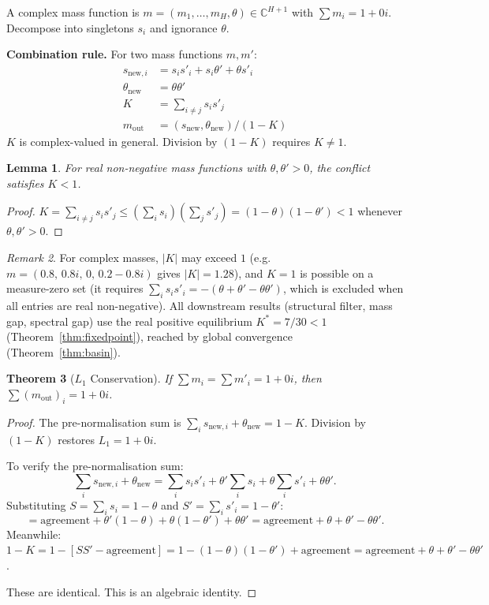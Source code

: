 \documentclass[11pt,a4paper]{article}
\newtheorem{theorem}{Theorem}[section]
\newtheorem{lemma}[theorem]{Lemma}
\theoremstyle{definition}
\theoremstyle{remark}
\newtheorem{remark}[theorem]{Remark}
\newcommand{\C}{\mathbb{C}}
\begin{document}
A complex mass function is $m=(m_1,\ldots,m_H,\theta)\in\C^{H+1}$ with $\sum m_i=1+0i$. Decompose into singletons $s_i$ and ignorance $\theta$.

\textbf{Combination rule.} For two mass functions $m,m'$:
\begin{align}
s_{\mathrm{new},i}&=s_is'_i+s_i\theta'+\theta s'_i \label{eq:snew}\\
\theta_{\mathrm{new}}&=\theta\theta' \label{eq:thnew}\\
K&=\sum_{i\neq j}s_is'_j \label{eq:K}\\
m_{\mathrm{out}}&=(s_{\mathrm{new}},\theta_{\mathrm{new}})/(1-K) \label{eq:mout}
\end{align}
$K$ is complex-valued in general. Division by $(1-K)$ requires $K\neq 1$.

\begin{lemma}\label{lem:Kbound}
For real non-negative mass functions with $\theta,\theta'>0$, the conflict satisfies $K<1$.
\end{lemma}

\begin{proof}
$K=\sum_{i\neq j}s_is'_j\leq(\sum_i s_i)(\sum_j s'_j)=(1-\theta)(1-\theta')<1$ whenever $\theta,\theta'>0$.
\end{proof}

\begin{remark}\label{rem:Kcomplex}
For complex masses, $|K|$ may exceed $1$ (e.g.\ $m=(0.8,\,0.8i,\,0,\,0.2\!-\!0.8i)$ gives $|K|=1.28$), and $K=1$ is possible on a measure-zero set (it requires $\sum_i s_is'_i=-({\theta+\theta'-\theta\theta'})$, which is excluded when all entries are real non-negative). All downstream results (structural filter, mass gap, spectral gap) use the real positive equilibrium $K^*=7/30<1$ (Theorem~\ref{thm:fixedpoint}), reached by global convergence (Theorem~\ref{thm:basin}).
\end{remark}

\begin{theorem}[$L_1$ Conservation]\label{thm:L1}
If $\sum m_i=\sum m'_i=1+0i$, then $\sum(m_{\mathrm{out}})_i=1+0i$.
\end{theorem}

\begin{proof}
The pre-normalisation sum is $\sum_i s_{\mathrm{new},i}+\theta_{\mathrm{new}}=1-K$. Division by $(1-K)$ restores $L_1=1+0i$.

To verify the pre-normalisation sum:
\[
\sum_i s_{\mathrm{new},i}+\theta_{\mathrm{new}} = \sum_i s_is'_i + \theta'\sum_i s_i + \theta\sum_i s'_i + \theta\theta'.
\]
Substituting $S=\sum_i s_i=1-\theta$ and $S'=\sum_i s'_i=1-\theta'$:
\[
=\text{agreement}+\theta'(1-\theta)+\theta(1-\theta')+\theta\theta' = \text{agreement}+\theta+\theta'-\theta\theta'.
\]
Meanwhile: $1-K=1-[SS'-\text{agreement}]=1-(1-\theta)(1-\theta')+\text{agreement}=\text{agreement}+\theta+\theta'-\theta\theta'$.

These are identical. This is an algebraic identity.
\end{proof}
\end{document}
